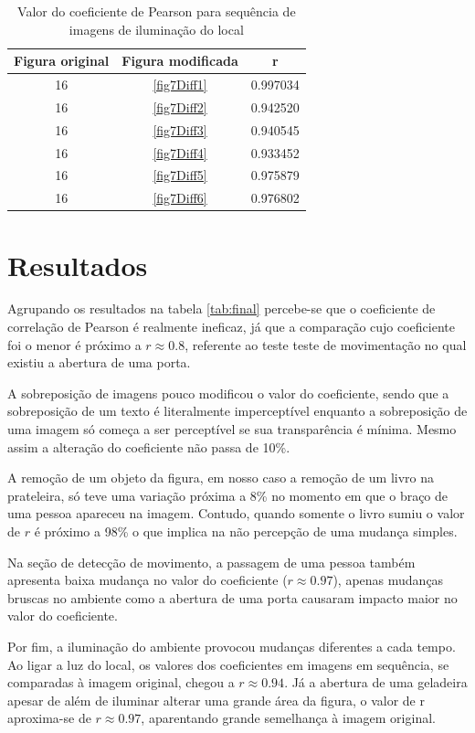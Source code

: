 \documentclass[10pt,a4paper]{article}
\begin{document}
\begin{table}[h!]
  \begin{center}
    \caption{Valor do coeficiente de Pearson para sequência de imagens
      de iluminação do local}
    \begin{tabular}{|c|c|c|}
      \hline
      Figura original & Figura modificada & r\\
      \hline
      16 &  \ref{fig7Diff1} & 0.997034\\
      16 &  \ref{fig7Diff2} & 0.942520\\
      16 &  \ref{fig7Diff3} & 0.940545\\
      16 &  \ref{fig7Diff4} & 0.933452\\
      16 &  \ref{fig7Diff5} & 0.975879\\
      16 &  \ref{fig7Diff6} & 0.976802\\
      \hline
    \end{tabular}
  \end{center}
\end{table}
\newpage
\section{Resultados}
Agrupando os resultados na tabela \ref{tab:final} percebe-se que o
coeficiente de correlação de Pearson é realmente ineficaz, já que a
comparação cujo coeficiente foi o menor é próximo a $r\approx 0.8$, referente
ao teste teste de movimentação no qual existiu a abertura de uma porta.

A sobreposição de imagens pouco modificou o valor do coeficiente,
sendo que a sobreposição de um texto é literalmente imperceptível
enquanto a sobreposição de uma imagem só começa a ser perceptível se
sua transparência é mínima. Mesmo assim a alteração do coeficiente não
passa de 10\%.

A remoção de um objeto da figura, em nosso caso a remoção de um livro
na prateleira, só teve uma variação próxima a 8\% no momento em que o
braço de uma pessoa apareceu na imagem. Contudo, quando somente o
livro sumiu o valor de $r$ é próximo a 98\% o que implica na não
percepção de uma mudança simples.

Na seção de detecção de movimento, a passagem de uma pessoa também
apresenta baixa mudança no valor do coeficiente ($r\approx 0.97$), apenas
mudanças bruscas no ambiente como a abertura de uma porta
causaram impacto maior no valor do coeficiente.

Por fim, a iluminação do ambiente provocou mudanças diferentes a cada
tempo. Ao ligar a luz do local, os valores dos
coeficientes em imagens em sequência, se comparadas à imagem original, chegou a $r\approx 0.94 $. Já a
abertura de uma geladeira apesar de além de iluminar alterar uma grande área da
figura, o valor de r aproxima-se de $r\approx 0.97$, aparentando
grande semelhança à imagem original.
\end{document}

